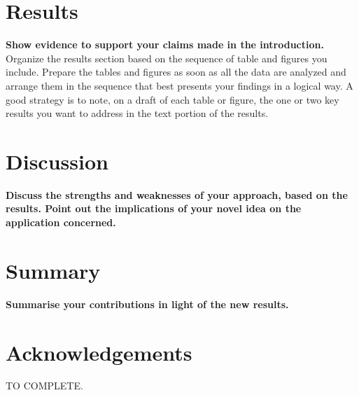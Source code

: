 \documentclass[10pt,conference,compsocconf]{IEEEtran}
\begin{document}
\section{Results}\label{sec:results}
\textbf{Show evidence to support your claims made in the
  introduction.}
  Organize the results section based on the sequence of table and
figures you include. Prepare the tables and figures as soon as all
the data are analyzed and arrange them in the sequence that best
presents your findings in a logical way. A good strategy is to note,
on a draft of each table or figure, the one or two key results you
want to address in the text portion of the results.

\section{Discussion}\label{sec:discussion}
  \textbf{Discuss the strengths and weaknesses of your
  approach, based on the results. Point out the implications of your
  novel idea on the application concerned.}
  
\section{Summary}\label{sec:summary}
  \textbf{Summarise your contributions in light of the new
  results.}

\section*{Acknowledgements}
TO COMPLETE.

\newpage


\end{document}

